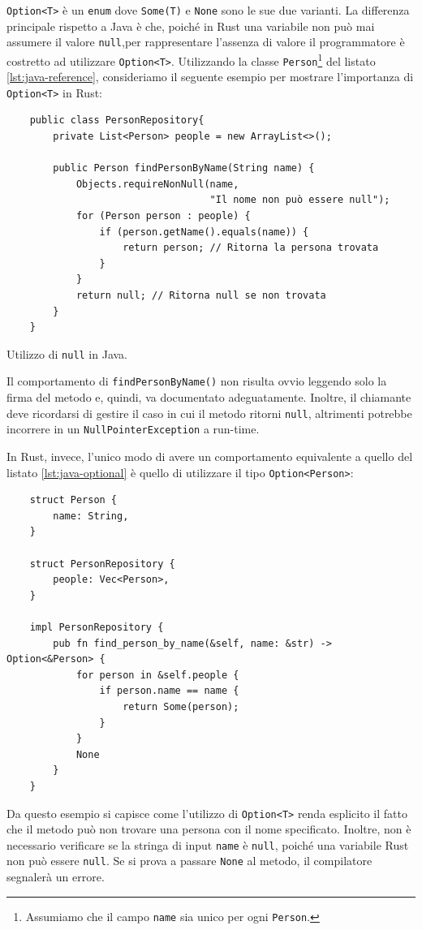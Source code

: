\texttt{Option<T>} è un \texttt{enum} dove \texttt{Some(T)} e \texttt{None} sono le sue due varianti. La differenza principale rispetto a Java è che, poiché in Rust una variabile non può mai assumere il valore \texttt{null},per rappresentare l'assenza di valore il programmatore è costretto ad utilizzare \texttt{Option<T>}. Utilizzando la classe \texttt{Person}\footnote{Assumiamo che il campo \texttt{name} sia unico per ogni \texttt{Person}.} del listato \ref{lst:java-reference}, consideriamo il seguente esempio per mostrare l'importanza di \texttt{Option<T>} in Rust: 
\begin{listing}[h]
    \begin{verbatim}
    public class PersonRepository{
        private List<Person> people = new ArrayList<>();

        public Person findPersonByName(String name) {
            Objects.requireNonNull(name, 
                                   "Il nome non può essere null");
            for (Person person : people) {
                if (person.getName().equals(name)) {
                    return person; // Ritorna la persona trovata
                }
            }
            return null; // Ritorna null se non trovata
        }
    }
    \end{verbatim}
    \caption{Utilizzo di \texttt{null} in Java.}
    \label{lst:java-optional}
\end{listing}

Il comportamento di \texttt{findPersonByName()} non risulta ovvio leggendo solo la firma del metodo e, quindi, va documentato adeguatamente. Inoltre, il chiamante deve ricordarsi di gestire il caso in cui il metodo ritorni \texttt{null}, altrimenti potrebbe incorrere in un \texttt{NullPointerException} a run-time. 

In Rust, invece, l'unico modo di avere un comportamento equivalente a quello del listato \ref{lst:java-optional} è quello di utilizzare il tipo \texttt{Option<Person>}:
\begin{verbatim}
    struct Person {
        name: String,
    }

    struct PersonRepository {
        people: Vec<Person>,
    }

    impl PersonRepository {
        pub fn find_person_by_name(&self, name: &str) -> Option<&Person> {
            for person in &self.people {
                if person.name == name {
                    return Some(person); 
                }
            }
            None
        }
    }
\end{verbatim}
Da questo esempio si capisce come l'utilizzo di \texttt{Option<T>} renda esplicito il fatto che il metodo può non trovare una persona con il nome specificato. Inoltre, non è necessario verificare se la stringa di input \texttt{name} è \texttt{null}, poiché una variabile Rust non può essere \texttt{null}. Se si prova a passare \texttt{None} al metodo, il compilatore segnalerà un errore.

